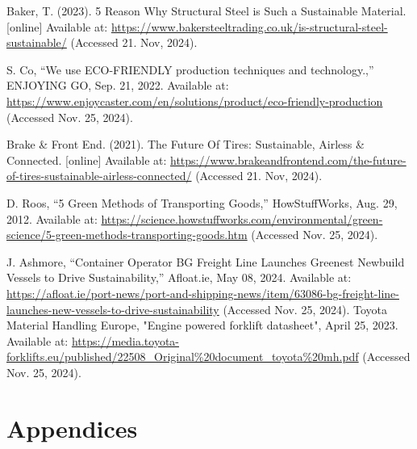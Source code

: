 \documentclass[12pt]{article}
\begin{document}
\begin{thebibliography}{99}
 Baker, T. (2023). 5 Reason Why Structural Steel is Such a Sustainable Material. [online] Available at: \url{https://www.bakersteeltrading.co.uk/is-structural-steel-sustainable/} (Accessed 21. Nov, 2024).

 S. Co, “We use ECO-FRIENDLY production techniques and technology.,” ENJOYING GO, Sep. 21, 2022. Available at: \url{https://www.enjoycaster.com/en/solutions/product/eco-friendly-production} (Accessed Nov. 25, 2024).

 Brake \& Front End. (2021). The Future Of Tires: Sustainable, Airless \& Connected. [online] Available at: \url{https://www.brakeandfrontend.com/the-future-of-tires-sustainable-airless-connected/} (Accessed 21. Nov, 2024).

 D. Roos, “5 Green Methods of Transporting Goods,” HowStuffWorks, Aug. 29, 2012. Available at: \url{https://science.howstuffworks.com/environmental/green-science/5-green-methods-transporting-goods.htm} (Accessed Nov. 25, 2024).

 J. Ashmore, “Container Operator BG Freight Line Launches Greenest Newbuild Vessels to Drive Sustainability,” Afloat.ie, May 08, 2024. Available at: \url{https://afloat.ie/port-news/port-and-shipping-news/item/63086-bg-freight-line-launches-new-vessels-to-drive-sustainability} (Accessed Nov. 25, 2024).
 Toyota Material Handling Europe, "Engine powered forklift datasheet", April 25, 2023. Available at: \url{https://media.toyota-forklifts.eu/published/22508_Original%20document_toyota%20mh.pdf} (Accessed Nov. 25, 2024).

 

\end{thebibliography}
 
 

\section{Appendices}
\renewcommand{\listfigurename}{Figures}
\renewcommand{\listtablename}{Tables}
\listoffigures                                         %
\listoftables                                        %
\end{document}
